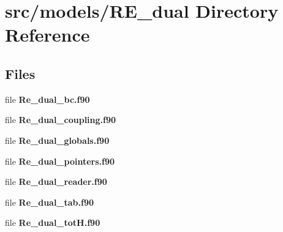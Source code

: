 \section{src/models/\+R\+E\+\_\+dual Directory Reference}
\label{dir_6c1e994dc814eb4a15a8fc3df6504609}
\subsection*{Files}
\begin{DoxyCompactItemize}
\item 
file {\bf Re\+\_\+dual\+\_\+bc.\+f90}
\item 
file {\bf Re\+\_\+dual\+\_\+coupling.\+f90}
\item 
file {\bf Re\+\_\+dual\+\_\+globals.\+f90}
\item 
file {\bf Re\+\_\+dual\+\_\+pointers.\+f90}
\item 
file {\bf Re\+\_\+dual\+\_\+reader.\+f90}
\item 
file {\bf Re\+\_\+dual\+\_\+tab.\+f90}
\item 
file {\bf Re\+\_\+dual\+\_\+tot\+H.\+f90}
\end{DoxyCompactItemize}
